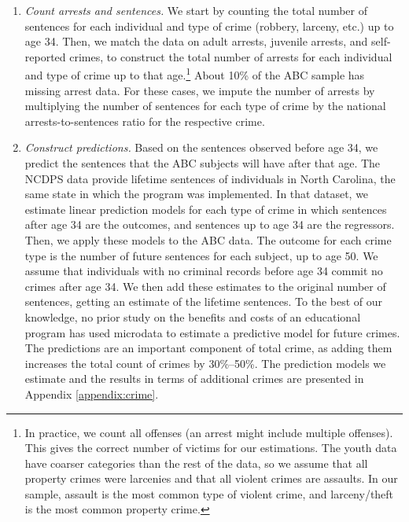 \begin{enumerate}
\item \textit{Count arrests and sentences.} We start by counting the total number of sentences for each individual
and type of crime (robbery, larceny, etc.) up to age 34. Then, we match the data on adult arrests, juvenile arrests, and self-reported crimes, to construct the total number of  arrests for each individual and type of crime up to that age.\footnote{In practice, we count all offenses (an arrest might include multiple offenses). This gives the correct number of victims for our estimations. The youth data have coarser categories than the rest of the data, so we assume that all property crimes were larcenies and that all violent crimes are assaults. In our sample, assault is the most common type of violent crime, and larceny/theft is the most common property crime.} About 10\% of the ABC sample has missing arrest data. For these cases, we impute the number of arrests by multiplying the number of sentences for each type of crime by the  national arrests-to-sentences ratio for the respective crime.

\item \textit{Construct predictions.} Based on the sentences observed before age 34, we predict the sentences
that the ABC subjects will have after that age. The NCDPS data provide lifetime sentences of individuals in North Carolina, the same state in which the program was implemented. In that dataset, we estimate linear prediction models for each type of crime in which sentences after age 34 are the outcomes, and sentences up to age 34 are the regressors. Then, we apply these models to the ABC data. The outcome for each crime type is the number of future sentences for each subject, up to age 50. We assume that individuals with no criminal records before age 34 commit no crimes after age 34. We then add these estimates to the original number of sentences, getting an estimate of the lifetime sentences. To the best of our knowledge, no prior study on the benefits and costs of an educational program has used microdata to estimate a predictive model for future crimes. The predictions are an important component of total crime, as adding them increases the total count of crimes by 30\%--50\%. The prediction models we estimate and the results in terms of additional crimes are presented in Appendix \ref{appendix:crime}.


\end{enumerate}
